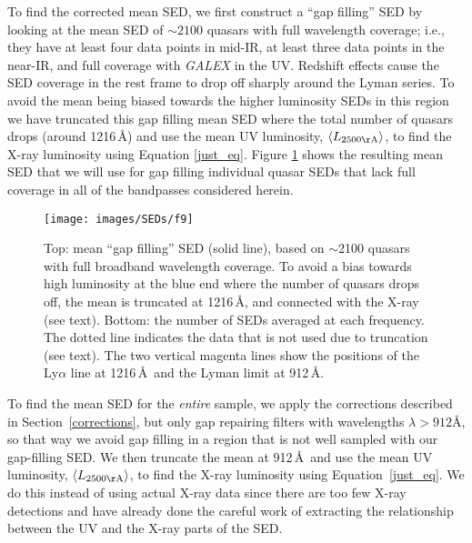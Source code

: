 To find the corrected mean SED, we first construct a ``gap filling'' SED by looking at the mean SED of $\sim 2100$ quasars with full wavelength coverage; i.e., they have at least four data points in mid-IR, at least three data points in the near-IR, and full coverage with {\em GALEX} in the UV. Redshift effects cause the SED coverage in the rest frame to drop off sharply around the Lyman series.  To avoid the mean being biased towards the higher luminosity SEDs in this region we have truncated this gap filling mean SED where the total number of quasars drops (around 1216\,\AA) and use the mean UV luminosity, $\langle L_{2500{\rm \AA}} \rangle$, to find the X-ray luminosity using Equation \ref{just_eq}. Figure \ref{mean_full} shows the resulting mean SED that we will use for gap filling individual quasar SEDs that lack full coverage in all of the bandpasses considered herein.

\begin{figure}[t]
 \centering
 \texttt{[image: images/SEDs/f9]}
 \caption[Gap filling SED]{Top: mean ``gap filling'' SED (solid line), based on $\sim$2100 quasars with full broadband wavelength coverage.
 To avoid a bias towards high luminosity at the blue end where the number of quasars drops off, the mean is truncated at 1216\,\AA, and connected with the X-ray (see text).
 Bottom: the number of SEDs averaged at each frequency.  The dotted line indicates the data that is not used due to truncation (see text).
 The two vertical magenta lines show the positions of the Ly$\alpha$ line at 1216\,\AA\ and the Lyman limit at 912\,\AA.}
 \label{mean_full}
\end{figure}

To find the mean SED for the {\em entire} sample, we apply the corrections described in Section~\ref{corrections}, but only gap repairing filters with wavelengths $\lambda>912$\AA, so that way we avoid gap filling in a region that is not well sampled with our gap-filling SED. We then truncate the mean at 912\,\AA\ and use the mean UV luminosity, $\langle L_{2500{\rm \AA}} \rangle$, to find the X-ray luminosity using Equation~\ref{just_eq}.
We do this instead of using actual X-ray data since there are too few X-ray detections and \citet{Steffen:2006} have already done the careful work of extracting the relationship between the UV and the X-ray parts of the SED.


